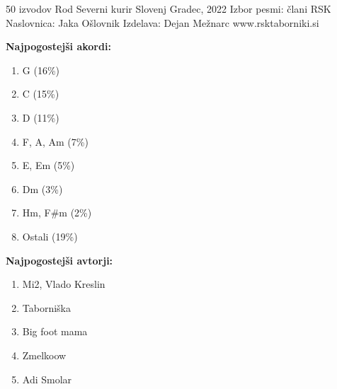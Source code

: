 \thispagestyle{empty}

\setlength\columnsep{40pt}

\begin{multicols}{2}


	\vspace*{\fill}

	50 izvodov\linebreak
	Rod Severni kurir\linebreak
	Slovenj Gradec, 2022\linebreak\linebreak
	Izbor pesmi: člani RSK\linebreak
	Naslovnica: Jaka Ošlovnik\linebreak
	Izdelava: Dejan Mežnarc\linebreak\linebreak
	www.rsktaborniki.si
	\columnbreak

	\vspace*{\fill}
	\textbf{Najpogostejši akordi:}
	\begin{enumerate}
		\itemsep0em
		\item G (16\%)
		\item C (15\%)
		\item D (11\%)
		\item F, A, Am (7\%)
		\item E, Em (5\%)
		\item Dm (3\%)
		\item Hm, F#m (2\%)
		\item Ostali (19\%)
	\end{enumerate}

	\textbf{\linebreak Najpogostejši avtorji:}
	\begin{enumerate}
		\itemsep0em
		\item Mi2, Vlado Kreslin
		\item Taborniška
		\item Big foot mama
		\item Zmelkoow
		\item Adi Smolar
	\end{enumerate}



\end{multicols}



